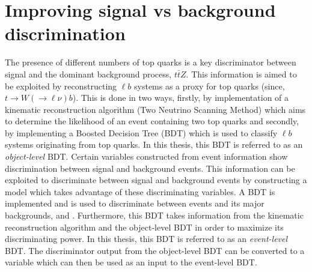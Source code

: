 \section{Improving signal vs background discrimination}
The presence of different numbers of top quarks is a key discriminator between signal and the dominant background process, $t\bar{t}Z$. This information is aimed to be exploited by reconstructing $\ell b$ systems as a proxy for top quarks (since, $t\rightarrow W(\rightarrow \ell \nu) b$). This is done in two ways, firstly, by implementation of a kinematic reconstruction algorithm (Two Neutrino Scanning Method) which aims to determine the likelihood of an event containing two top quarks and secondly, by implementing a Boosted Decision Tree (BDT) which is used to classify $\ell b$ systems originating from top quarks. In this thesis, this BDT is referred to as an \textit{object-level} BDT. Certain variables constructed from event information show discrimination between signal and background events. This information can be exploited to discriminate between signal and background events by constructing a model which takes advantage of these discriminating variables. A BDT is implemented and is used to discriminate between \tWZ events and its major backgrounds, \ttZ and \ZZ. Furthermore, this BDT takes information from the kinematic reconstruction algorithm and the object-level BDT in order to maximize its discriminating power. In this thesis, this BDT is referred to as an \textit{event-level} BDT. The discriminator output from the object-level BDT can be converted to a variable which can then be used as an input to the event-level BDT.


